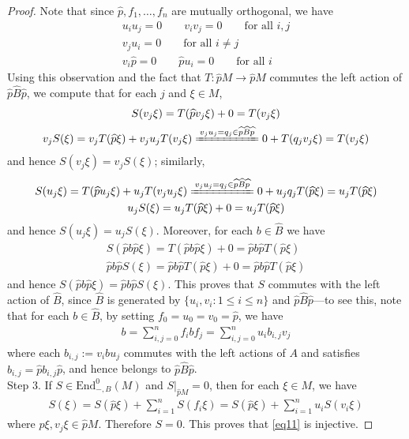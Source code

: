 \documentclass[11pt,b5paper,notitlepage]{article}
\theoremstyle{definition}
\theoremstyle{plain}
\newcommand{\wht}{\widehat}
\newcommand{\End}{\mathrm{End}} %
\numberwithin{equation}{section}
\begin{document}
\begin{proof}
Note that since $\wht p,f_1,\dots,f_n$ are mutually orthogonal, we have
\begin{gather*}
u_iu_j=0\qquad v_iv_j=0\qquad\text{for all }i,j\\
v_ju_i=0\qquad\text{for all } i\neq j\\
v_i\wht p=0\qquad \wht pu_i=0\qquad\text{for all }i
\end{gather*}
Using this observation and the fact that $T:\wht pM\rightarrow\wht pM$ commutes the left action of $\wht p\wht B\wht p$, we compute that for each $j$ and $\xi\in M$,
  \begin{gather*}
	S(v_j\xi)=T(\wht pv_j \xi)+0= T(v_j \xi)\\
	v_j S(\xi)=v_jT(\wht p\xi)+v_ju_j T(v_j\xi)\xlongequal{v_ju_j=q_j\in \wht p\wht B\wht p}0+T(q_jv_j\xi)=T(v_j \xi)
  \end{gather*}
and hence $S(v_j\xi)=v_j S(\xi)$; similarly,
  \begin{gather*}
	S(u_j \xi)=T(\wht pu_j \xi)+u_jT(v_ju_j\xi)\xlongequal{v_ju_j=q_j\in \wht p\wht B\wht p}  0+u_jq_jT(\wht p\xi)=u_j T(\wht p\xi)\\
	u_j S(\xi)=u_j T(\wht p\xi)+0=u_j T(\wht p\xi)
  \end{gather*}
and hence $S(u_j\xi)=u_j S(\xi)$. Moreover, for each $b\in\wht B$ we have
\begin{gather*}
S(\wht pb\wht p\xi)=T(\wht pb\wht p\xi)+0=\wht pb\wht pT(\wht p\xi)\\
\wht pb\wht pS(\xi)=\wht pb\wht pT(\wht p\xi)+0=\wht pb\wht pT(\wht p\xi)
\end{gather*}
and hence $S(\wht pb\wht p\xi)=\wht pb\wht pS(\xi)$. This proves that $S$ commutes with the left action of $\wht B$, since $\wht B$ is generated by $\{u_i,v_i:1\leq i\leq n\}$ and $\wht p\wht B\wht p$---to see this, note that for each $b\in\wht B$, by setting $f_0=u_0=v_0=\wht p$, we have
\begin{align*}
b=\sum_{i,j=0}^n f_ibf_j=\sum_{i,j=0}^nu_ib_{i,j}v_j
\end{align*}
where each $b_{i,j}:=v_ibu_j$ commutes with the left actions of $A$ and satisfies $b_{i,j}=\wht pb_{i,j}\wht p$, and hence belongs to $\wht p\wht B\wht p$. \\[-1ex]

Step 3. If $S\in\End^0_{-,B}(M)$ and $S|_{\wht pM}=0$, then for each $\xi\in M$, we have
\begin{align*}
S(\xi)=S(\wht p\xi)+\sum_{i=1}^n S(f_i\xi)=S(\wht p\xi)+\sum_{i=1}^n u_iS(v_i\xi)
\end{align*}
where $\wht p\xi,v_j\xi\in\wht p M$. Therefore $S=0$. This proves that \eqref{eq11} is injective.
\end{proof}
\end{document}
